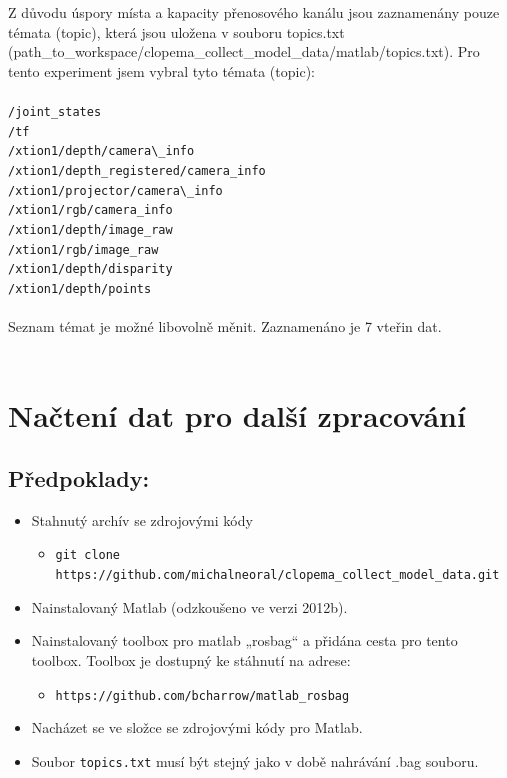 \documentclass[10pt,a4paper,titlepage,oneside]{book}
\begin{document}
Z důvodu úspory místa a kapacity přenosového kanálu jsou zaznamenány pouze témata (topic), která jsou uložena v souboru topics.txt  (path\_to\_workspace/clopema\_collect\_model\_data/matlab/topics.txt). Pro tento experiment jsem vybral tyto témata (topic):\\
\\
\indent \indent \indent \verb|/joint_states| \\
\indent \indent \indent \verb|/tf| \\
\indent \indent \indent \verb|/xtion1/depth/camera\_info| \\
\indent \indent \indent \verb|/xtion1/depth_registered/camera_info| \\
\indent \indent \indent \verb|/xtion1/projector/camera\_info| \\
\indent \indent \indent \verb|/xtion1/rgb/camera_info| \\
\indent \indent \indent \verb|/xtion1/depth/image_raw| \\
\indent \indent \indent \verb|/xtion1/rgb/image_raw |\\
\indent \indent \indent \verb|/xtion1/depth/disparity |\\
\indent \indent \indent \verb|/xtion1/depth/points|\\
\\

Seznam témat je možné libovolně měnit. Zaznamenáno je 7 vteřin dat.\\
\\

\section*{Načtení dat pro další zpracování}
\subsection*{Předpoklady:}
\begin{itemize}
   \item Stahnutý archív se zdrojovými kódy
  \begin{itemize}
  	\item \verb|git clone https://github.com/michalneoral/clopema_collect_model_data.git|
  \end{itemize}
  
  \item Nainstalovaný Matlab (odzkoušeno ve verzi 2012b).
  \item Nainstalovaný toolbox pro matlab „rosbag“ a přidána cesta pro tento toolbox. Toolbox je dostupný ke stáhnutí na adrese:
  \begin{itemize}
     \item \verb|https://github.com/bcharrow/matlab_rosbag|
  \end{itemize}
  \item Nacházet se ve složce se zdrojovými kódy pro Matlab.
  \item Soubor \verb|topics.txt| musí být stejný jako v době nahrávání .bag souboru.
\end{itemize}
\end{document}
